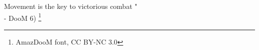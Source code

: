 \cleardoublepage
\thispagestyle{empty} %

\vspace*{8cm}

\hfill

{\doomfontL\huge{\Huge {} Movement is the key to victorious combat "} \\ \doomfontL \hspace{10cm} - {\huge D}{\doomfontR\huge o}{\doomfontL\huge o}}{\doomfontR\huge M} {}{\doomfontR\huge 6) \footnotesize \footnote{AmazDooM font, CC BY-NC 3.0}}
